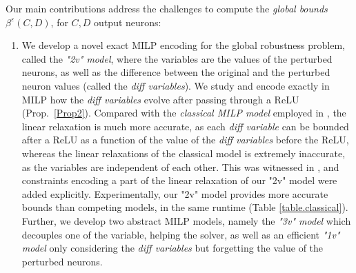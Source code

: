 Our main contributions address the challenges to compute the {\em global bounds} $\beta^\varepsilon(C,D)$, for $C,D$ output neurons:
\begin{enumerate}
	
	\item We develop a novel exact MILP encoding for the global robustness problem,
	called the {\em "2v" model}, where the variables are the values of the perturbed neurons, as well as the difference between the original and the perturbed neuron values (called the {\em diff variables}). We study and encode exactly in MILP how the {\em diff variables} evolve after passing through a ReLU (Prop.~\ref{Prop2}). Compared with the
	{\em classical MILP model} \cite{MILP} employed in \cite{vhagar,lipshitz},
	the linear relaxation is much more accurate, as each {\em diff variable} can be bounded after a ReLU as a function of the value of the {\em diff variables} before the ReLU, whereas the linear relaxations of the classical model is extremely inaccurate, as the variables are independent of each other. This was witnessed in \cite{lipshitz}, and constraints encoding a part of the linear relaxation of our "2v" model were added explicitly. Experimentally, 
	our "2v" model provides more accurate bounds than competing models, in the same runtime
	(Table \ref{table.classical}).
	Further, we develop two abstract MILP models, namely the {\em "3v" model} which decouples one of the variable, helping the solver, as well as an efficient {\em "1v" model} only considering the {\em diff variables} but forgetting the value of the perturbed neurons.
	


\end{enumerate}
